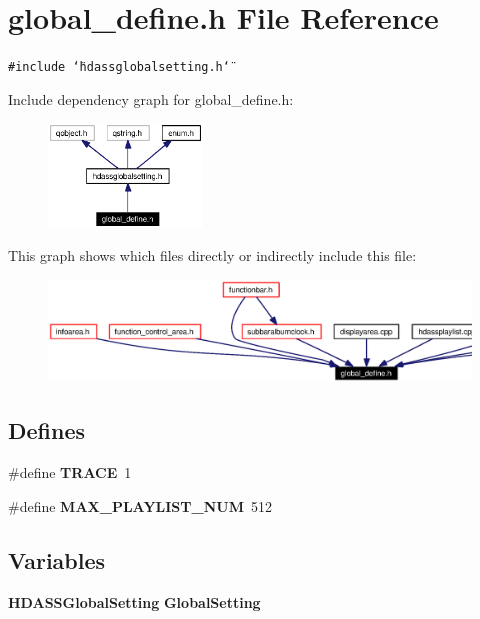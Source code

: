 \section{global\_\-define.h File Reference}
\label{global__define_8h}


{\tt \#include \char`\"{}hdassglobalsetting.h\char`\"{}}\par


Include dependency graph for global\_\-define.h:\begin{figure}[H]
\begin{center}
\leavevmode
\includegraphics[width=116pt]{global__define_8h__incl}
\end{center}
\end{figure}


This graph shows which files directly or indirectly include this file:\begin{figure}[H]
\begin{center}
\leavevmode
\includegraphics[width=420pt]{global__define_8h__dep__incl}
\end{center}
\end{figure}
\subsection*{Defines}
\begin{CompactItemize}
\item 
\#define {\bf TRACE}\ 1
\item 
\#define {\bf MAX\_\-PLAYLIST\_\-NUM}\ 512
\end{CompactItemize}
\subsection*{Variables}
\begin{CompactItemize}
\item 
{\bf HDASSGlobal\-Setting} {\bf Global\-Setting}
\end{CompactItemize}


